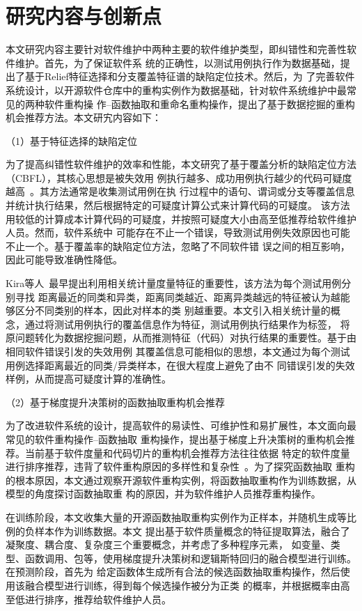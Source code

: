 \section{研究内容与创新点}
本文研究内容主要针对软件维护中两种主要的软件维护类型，即纠错性和完善性软件维护。首先，为了保证软件系
统的正确性，以测试用例执行作为数据基础，提出了基于Relief特征选择和分支覆盖特征谱的缺陷定位技术。然后，为
了完善软件系统设计，以开源软件仓库中的重构实例作为数据基础，针对软件系统维护中最常见的两种软件重构操
作--函数抽取和重命名重构操作，提出了基于数据挖掘的重构机会推荐方法。本文研宄内容如下：

（1）基于特征选择的缺陷定位

为了提高纠错性软件维护的效率和性能，本文研究了基于覆盖分析的缺陷定位方法（CBFL），其核心思想是被失效用
例执行越多、成功用例执行越少的代码可疑度越高~\cite{jones2005empirical}。其方法通常是收集测试用例在执
行过程中的语句、谓词或分支等覆盖信息并统计执行结果，然后根据特定的可疑度计算公式来计算代码的可疑度。
该方法用较低的计算成本计算代码的可疑度，并按照可疑度大小由高至低推荐给软件维护人员。然而，软件系统中
可能存在不止一个错误，导致测试用例失效原因也可能不止一个。基于覆盖率的缺陷定位方法，忽略了不同软件错
误之间的相互影响，因此可能导致准确性降低。

Kira等人~\cite{kira1992feature}最早提出利用相关统计量度量特征的重要性，该方法为每个测试用例分别寻找
距离最近的同类和异类，距离同类越近、距离异类越远的特征被认为越能够区分不同类别的样本，因此对样本的类
别越重要。本文引入相关统计量的概念，通过将测试用例执行的覆盖信息作为特征，测试用例执行结果作为标签，
将原问题转化为数据挖掘问题，从而推测特征（代码）对执行结果的重要性。基于由相同软件错误引发的失效用例
其覆盖信息可能相似的思想，本文通过为每个测试用例选择距离最近的同类/异类样本，在很大程度上避免了由不
同错误引发的失效样例，从而提高可疑度计算的准确性。

（2）基于梯度提升决策树的函数抽取重构机会推荐

为了改进软件系统的设计，提高软件的易读性、可维护性和易扩展性，本文面向最常见的软件重构操作--函数抽取
重构操作，提出基于梯度上升决策树的重构机会推荐。当前基于软件度量和代码切片的重构机会推荐方法往往依据
特定的软件度量进行排序推荐，违背了软件重构原因的多样性和复杂性~\cite{silva2016we}。为了探究函数抽取
重构的根本原因，本文通过观察开源软件重构实例，将函数抽取重构作为训练数据，从模型的角度探讨函数抽取重
构的原因，并为软件维护人员推荐重构操作。

在训练阶段，本文收集大量的开源函数抽取重构实例作为正样本，并随机生成等比例的负样本作为训练数据。本文
提出基于软件质量概念的特征提取算法，融合了凝聚度、耦合度、复杂度三个重要概念，并考虑了多种程序元素，
如变量、类型、函数调用、包等，使用梯度提升决策树和逻辑斯特回归的融合模型进行训练。在预测阶段，首先为
给定函数体生成所有合法的候选函数抽取重构操作，然后使用该融合模型进行训练，得到每个候选操作被分为正类
的概率，并根据概率由高至低进行排序，推荐给软件维护人员。


